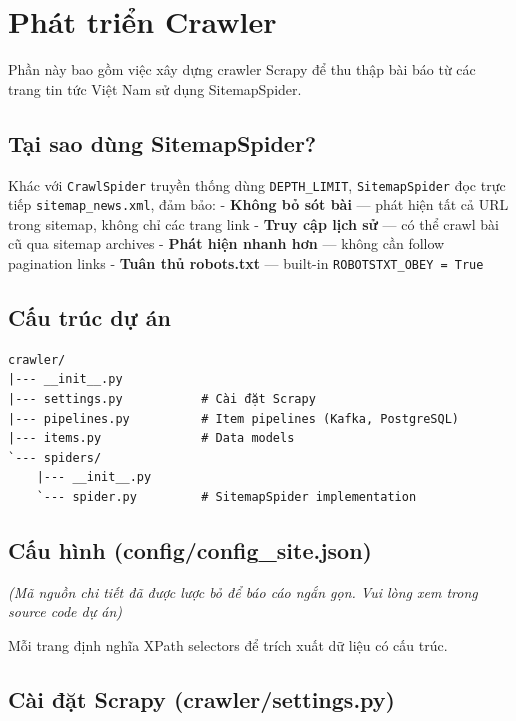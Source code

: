 \hypertarget{phuxe1t-triux1ec3n-crawler}{%
\section{Phát triển Crawler}}

Phần này bao gồm việc xây dựng crawler Scrapy để thu thập bài báo từ các
trang tin tức Việt Nam sử dụng SitemapSpider.

\hypertarget{tux1ea1i-sao-duxf9ng-sitemapspider}{%
\subsection{Tại sao dùng
SitemapSpider?}}

Khác với \texttt{CrawlSpider} truyền thống dùng \texttt{DEPTH\_LIMIT},
\texttt{SitemapSpider} đọc trực tiếp \texttt{sitemap\_news.xml}, đảm
bảo: - \textbf{Không bỏ sót bài} --- phát hiện tất cả URL trong sitemap,
không chỉ các trang link - \textbf{Truy cập lịch sử} --- có thể crawl
bài cũ qua sitemap archives - \textbf{Phát hiện nhanh hơn} --- không cần
follow pagination links - \textbf{Tuân thủ robots.txt} --- built-in
\texttt{ROBOTSTXT\_OBEY\ =\ True}

\hypertarget{cux1ea5u-truxfac-dux1ef1-uxe1n}{%
\subsection{Cấu trúc dự án}}

\begin{verbatim}
crawler/
|--- __init__.py
|--- settings.py           # Cài đặt Scrapy
|--- pipelines.py          # Item pipelines (Kafka, PostgreSQL)
|--- items.py              # Data models
`--- spiders/
    |--- __init__.py
    `--- spider.py         # SitemapSpider implementation
\end{verbatim}

\hypertarget{cux1ea5u-huxecnh-configconfig_site.json}{%
\subsection{Cấu hình
(config/config\_site.json)}}

\emph{(Mã nguồn chi tiết đã được lược bỏ để báo cáo ngắn gọn. Vui lòng
xem trong source code dự án)}

Mỗi trang định nghĩa XPath selectors để trích xuất dữ liệu có cấu trúc.

\hypertarget{cuxe0i-ux111ux1eb7t-scrapy-crawlersettings.py}{%
\subsection{Cài đặt Scrapy
(crawler/settings.py)}}

